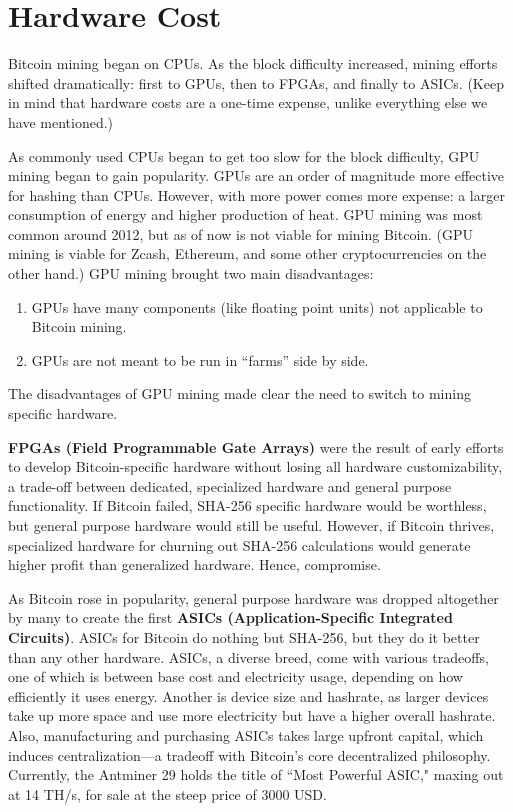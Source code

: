 \documentclass[full.tex]{subfiles}
\begin{document}
    \section*{Hardware Cost}
    
    Bitcoin mining began on CPUs. As the block difficulty increased, mining efforts shifted dramatically: first to GPUs, then to FPGAs, and finally to ASICs. (Keep in mind that hardware costs are a one-time expense, unlike everything else we have mentioned.)
    
    As commonly used CPUs began to get too slow for the block difficulty, GPU mining began to gain popularity. GPUs are an order of magnitude more effective for hashing than CPUs. However, with more power comes more expense: a larger consumption of energy and higher production of heat. GPU mining was most common around 2012, but as of now is not viable for mining Bitcoin. (GPU mining is viable for Zcash, Ethereum, and some other cryptocurrencies on the other hand.) GPU mining brought two main disadvantages:
    \begin{enumerate}
        \item GPUs have many components (like floating point units) not applicable to Bitcoin mining.
        \item GPUs are not meant to be run in ``farms'' side by side.
    \end{enumerate}
    
    \noindent The disadvantages of GPU mining made clear the need to switch to mining specific hardware.
    
    \textbf{FPGAs (Field Programmable Gate Arrays)} were the result of early efforts to develop Bitcoin-specific hardware without losing all hardware customizability, a trade-off between dedicated, specialized hardware and general purpose functionality. If Bitcoin failed, SHA-256 specific hardware would be worthless, but general purpose hardware would still be useful. However, if Bitcoin thrives, specialized hardware for churning out SHA-256 calculations would generate higher profit than generalized hardware. Hence, compromise.
    
    As Bitcoin rose in popularity, general purpose hardware was dropped altogether by many to create the first \textbf{ASICs (Application-Specific Integrated Circuits)}. ASICs for Bitcoin do nothing but SHA-256, but they do it better than any other hardware. ASICs, a diverse breed, come with various tradeoffs,  one of which is between base cost and electricity usage, depending on how efficiently it uses energy. Another is device size and hashrate, as larger devices take up more space and use more electricity but have a higher overall hashrate. Also, manufacturing and purchasing ASICs takes large upfront capital, which induces centralization---a tradeoff with Bitcoin's core decentralized philosophy. Currently, the Antminer 29 holds the title of ``Most Powerful ASIC," maxing out at 14 TH/s, for sale at the steep price of 3000 USD.
    
\end{document}
